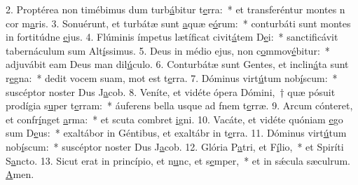 2. Proptérea non timébimus dum turb\uline{á}bitur t\uline{e}rra:~* et transferéntur montes n cor m\uline{a}ris.
3. Sonuérunt, et turbátæ sunt \uline{a}quæ e\uline{ó}rum:~* conturbáti sunt montes in fortitúdne \uline{e}jus.
4. Flúminis ímpetus lætíficat civit\uline{á}tem D\uline{e}i:~* sanctificávit tabernáculum sum Alt\uline{í}ssimus.
5. Deus in médio ejus, non c\uline{o}mmov\uline{é}bitur:~* adjuvábit eam Deus man dil\uline{ú}culo.
6. Conturbátæ sunt Gentes, et inclin\uline{á}ta sunt r\uline{e}gna:~* dedit vocem suam, mot est t\uline{e}rra.
7. Dóminus virt\uline{ú}tum nob\uline{í}scum:~* suscéptor noster Dus J\uline{a}cob.
8. Veníte, et vidéte ópera Dómini,~† quæ pósuit prodígia s\uline{u}per t\uline{e}rram:~* áuferens bella usque ad fnem t\uline{e}rræ.
9. Arcum cónteret, et confr\uline{í}nget \uline{a}rma:~* et scuta combret \uline{i}gni.
10. Vacáte, et vidéte quóniam \uline{e}go sum D\uline{e}us:~* exaltábor in Géntibus, et exaltábr in t\uline{e}rra.
11. Dóminus virt\uline{ú}tum nob\uline{í}scum:~* suscéptor noster Dus J\uline{a}cob.
12. Glória P\uline{a}tri, et F\uline{í}lio,~* et Spiríti S\uline{a}ncto.
13. Sicut erat in princípio, et n\uline{u}nc, et s\uline{e}mper,~* et in sǽcula sæculrum. \uline{A}men.
